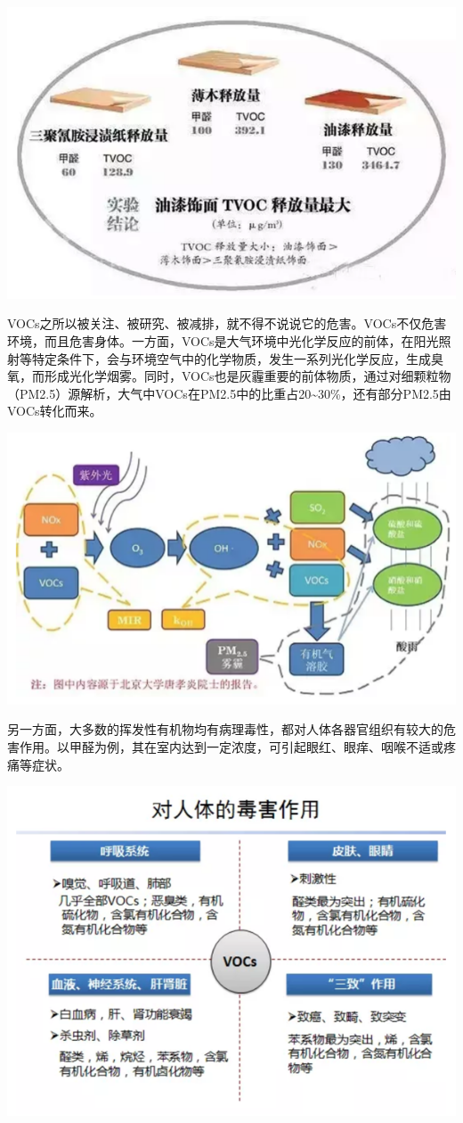 \documentclass[]{book}
\begin{document}
\includegraphics[width=8.33in]{images/voc1}

VOCs之所以被关注、被研究、被减排，就不得不说说它的危害。VOCs不仅危害环境，而且危害身体。一方面，VOCs是大气环境中光化学反应的前体，在阳光照射等特定条件下，会与环境空气中的化学物质，发生一系列光化学反应，生成臭氧，而形成光化学烟雾。同时，VOCs也是灰霾重要的前体物质，通过对细颗粒物（PM2.5）源解析，大气中VOCs在PM2.5中的比重占20\textasciitilde{}30\%，还有部分PM2.5由VOCs转化而来。

\includegraphics[width=8.33in]{images/voc2}

另一方面，大多数的挥发性有机物均有病理毒性，都对人体各器官组织有较大的危害作用。以甲醛为例，其在室内达到一定浓度，可引起眼红、眼痒、咽喉不适或疼痛等症状。

\includegraphics[width=8.33in]{images/voc3}
\end{document}
